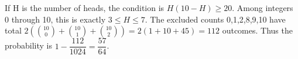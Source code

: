 If H is the number of heads, the condition is $H(10-H)\ge 20$. Among integers 0 through 10, this is exactly $3\le H\le 7$. The excluded counts 0,1,2,8,9,10 have total $2(\binom{10}0+\binom{10}1+\binom{10}2)=2(1+10+45)=112$ outcomes. Thus the probability is $1-\dfrac{112}{1024}=\boxed{\dfrac{57}{64}}$.
